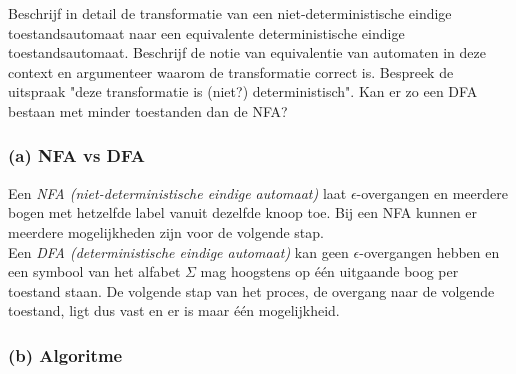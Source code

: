 \begin{quest}[Vraag 2]
Beschrijf in detail de transformatie van een niet-deterministische eindige toestandsautomaat naar een equivalente deterministische eindige toestandsautomaat. Beschrijf de notie van equivalentie van automaten in deze context en argumenteer waarom de transformatie correct is. Bespreek de uitspraak "deze transformatie is (niet?) deterministisch". Kan er zo een DFA bestaan met minder toestanden dan de NFA?
\end{quest}

\subsubsection*{(a) NFA vs DFA}

Een \emph{NFA (niet-deterministische eindige automaat)} laat $\epsilon$-overgangen en meerdere bogen met hetzelfde label vanuit dezelfde knoop toe. Bij een NFA kunnen er meerdere mogelijkheden zijn voor de volgende stap.  \\
Een \emph{DFA (deterministische eindige automaat)} kan geen $\epsilon$-overgangen hebben en een symbool van het alfabet $\Sigma$ mag hoogstens op \'e\'en  uitgaande boog per toestand staan. De volgende stap van het proces, de overgang naar de volgende toestand, ligt dus vast en er is maar \'e\'en mogelijkheid.

\subsubsection*{(b) Algoritme}

